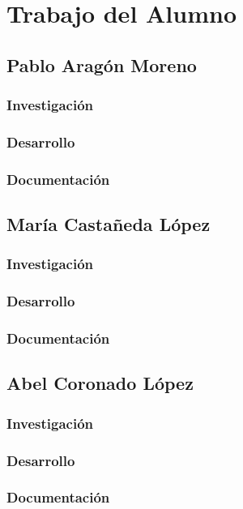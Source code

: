 \cleardoublepage

\chapter{Trabajo del Alumno}
\label{makereference9}

\section{Pablo Aragón Moreno}
\subsection{Investigación}
\subsection{Desarrollo}
\subsection{Documentación}


\section{María Castañeda López}
\subsection{Investigación}
\subsection{Desarrollo}
\subsection{Documentación}


\section{Abel Coronado López}
\subsection{Investigación}
\subsection{Desarrollo}
\subsection{Documentación}